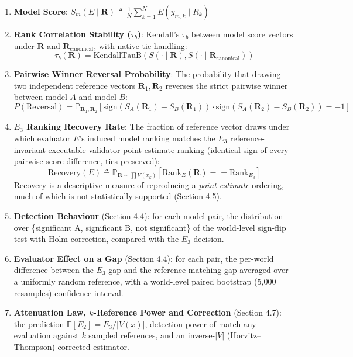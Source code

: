 \documentclass[11pt]{article}
\begin{document}
\begin{enumerate}
\item \textbf{Model Score}: $S_m(E \mid \mathbf{R}) \triangleq \frac{1}{N} \sum_{k=1}^N E(y_{m,k} \mid R_k)$
\item \textbf{Rank Correlation Stability ($\tau_b$)}: Kendall's $\tau_b$ between model score vectors under $\mathbf{R}$ and $\mathbf{R}_{\text{canonical}}$, with native tie handling:
\[\tau_b(\mathbf{R}) = \text{KendallTauB}\left( S(\cdot \mid \mathbf{R}), S(\cdot \mid \mathbf{R}_{\text{canonical}}) \right)\]
\item \textbf{Pairwise Winner Reversal Probability}: The probability that drawing two independent reference vectors $\mathbf{R}_1, \mathbf{R}_2$ reverses the strict pairwise winner between model $A$ and model $B$:
\[P(\text{Reversal}) = \mathbb{P}_{\mathbf{R}_1, \mathbf{R}_2} \left[ \text{sign}(S_A(\mathbf{R}_1) - S_B(\mathbf{R}_1)) \cdot \text{sign}(S_A(\mathbf{R}_2) - S_B(\mathbf{R}_2)) = -1 \right]\]
\item \textbf{$E_3$ Ranking Recovery Rate}: The fraction of reference vector draws under which evaluator $E$'s induced model ranking matches the $E_3$ reference-invariant executable-validator point-estimate ranking (identical sign of every pairwise score difference, ties preserved):
\[\text{Recovery}(E) \triangleq \mathbb{P}_{\mathbf{R} \sim \prod V(x_k)} \left[ \text{Rank}_E(\mathbf{R}) == \text{Rank}_{E_3} \right]\]
Recovery is a descriptive measure of reproducing a \emph{point-estimate} ordering, much of which is not statistically supported (Section 4.5).
\item \textbf{Detection Behaviour} (Section 4.4): for each model pair, the distribution over \{significant A, significant B, not significant\} of the world-level sign-flip test with Holm correction, compared with the $E_3$ decision.
\item \textbf{Evaluator Effect on a Gap} (Section 4.4): for each pair, the per-world difference between the $E_3$ gap and the reference-matching gap averaged over a uniformly random reference, with a world-level paired bootstrap (5,000 resamples) confidence interval.
\item \textbf{Attenuation Law, $k$-Reference Power and Correction} (Section 4.7): the prediction $\mathbb{E}[E_2] = E_3/|V(x)|$, detection power of match-any evaluation against $k$ sampled references, and an inverse-$|V|$ (Horvitz--Thompson) corrected estimator.
\end{enumerate}
\end{document}
